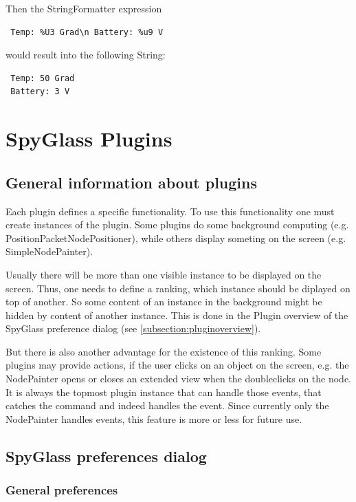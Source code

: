 Then the StringFormatter expression

\begin{verbatim}
 Temp: %U3 Grad\n Battery: %u9 V
\end{verbatim}

would result into the following String:

\begin{verbatim}
 Temp: 50 Grad
 Battery: 3 V
\end{verbatim}

\newpage
\section{SpyGlass Plugins}
\label{section:plugins}

\subsection{General information about plugins}

Each plugin defines a specific functionality. To use this functionality one must create instances of the plugin.
Some plugins do some background computing (e.g. PositionPacketNodePositioner), while others display someting
on the screen (e.g. SimpleNodePainter).

Usually there will be more than one visible instance to be displayed on the screen. Thus, one needs to define a ranking,
which instance should be diplayed on top of another. So some content of an instance in the background might be hidden
by content of another instance. This is done in the
Plugin overview of the SpyGlass preference dialog (see \ref{subsection:pluginoverview}).

But there is also another advantage for the existence of this ranking. Some plugins may provide actions, if the user
clicks on an object on the screen, e.g. the NodePainter opens or closes an extended view when the doubleclicks on
the node. It is always the topmost plugin instance that can handle those events, that catches the command and indeed
handles the event. Since currently only the NodePainter handles events, this feature is more or less for
future use.

\subsection{SpyGlass preferences dialog}

\subsubsection{General preferences}
\label{section:generalpreferences}

